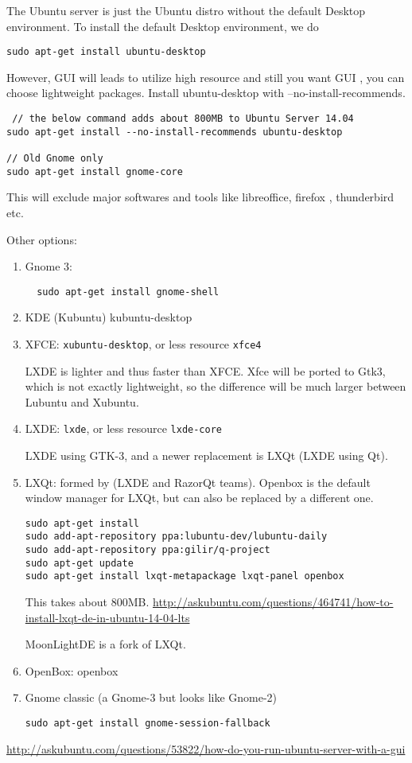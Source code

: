 The Ubuntu server is just the Ubuntu distro without the default Desktop
environment. To install the default Desktop environment, we do
\begin{verbatim}
sudo apt-get install ubuntu-desktop
\end{verbatim}
However, GUI will leads to utilize high resource and still you want GUI , you
can choose lightweight packages. Install ubuntu-desktop with
--no-install-recommends.
\begin{verbatim}
 // the below command adds about 800MB to Ubuntu Server 14.04
sudo apt-get install --no-install-recommends ubuntu-desktop

// Old Gnome only
sudo apt-get install gnome-core
\end{verbatim}
This will exclude major softwares and tools like libreoffice, firefox ,
thunderbird etc.

Other options:
\begin{enumerate}
  \item Gnome 3: 
  \begin{verbatim}
  sudo apt-get install gnome-shell
  \end{verbatim}
  
  \item KDE (Kubuntu) kubuntu-desktop
  
  \item XFCE: \verb!xubuntu-desktop!, or less resource \verb!xfce4!
  
  LXDE is lighter and thus faster than XFCE. Xfce will be ported to Gtk3, which
  is not exactly lightweight, so the difference will be much larger between
  Lubuntu and Xubuntu. 
  
  \item LXDE: \verb!lxde!, or less resource \verb!lxde-core!
  
  LXDE using GTK-3, and a newer replacement is LXQt (LXDE using Qt).
   
  
  \item LXQt: formed by (LXDE and RazorQt teams).
   Openbox is the default window manager for LXQt, but can also be replaced by a
   different one.
   
  \begin{verbatim}
sudo apt-get install   
sudo add-apt-repository ppa:lubuntu-dev/lubuntu-daily 
sudo add-apt-repository ppa:gilir/q-project
sudo apt-get update
sudo apt-get install lxqt-metapackage lxqt-panel openbox
  \end{verbatim}
  This takes about 800MB. 
  \url{http://askubuntu.com/questions/464741/how-to-install-lxqt-de-in-ubuntu-14-04-lts}
  
  MoonLightDE is a fork of LXQt.
  
  \item OpenBox: openbox
  
  \item Gnome classic (a Gnome-3 but looks like Gnome-2)
  
\begin{verbatim}
sudo apt-get install gnome-session-fallback
\end{verbatim}
\end{enumerate}
\url{http://askubuntu.com/questions/53822/how-do-you-run-ubuntu-server-with-a-gui}

